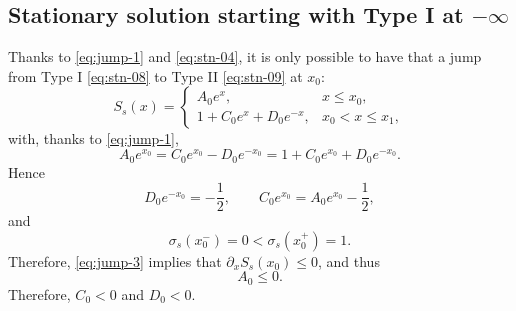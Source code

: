 \documentclass[12pt]{article}
\theoremstyle{definition}
\theoremstyle{remark}
\newcommand{\dx}{\partial_x}
\numberwithin{equation}{section}
\begin{document}
\subsection{Stationary solution starting with Type I at $ -\infty $}
\label{sec:stationary_first_kind}

Thanks to \eqref{eq:jump-1} and \eqref{eq:stn-04}, it is only possible to have that a jump from Type I \eqref{eq:stn-08} to Type II \eqref{eq:stn-09} at $ x_0 $: 
\begin{equation}
    \label{eq:stn-11}
    S_s(x) = \begin{cases}
        A_0 e^{x}, & x \leq x_0, \\
        1 + C_0 e^x + D_0 e^{-x}, & x_0 < x \leq x_1, 
    \end{cases}
\end{equation}
with, thanks to \eqref{eq:jump-1},
\begin{equation}\label{eq:stn-12}
    A_0 e^{x_0} = C_0 e^{x_0} - D_0 e^{-x_0} = 1 + C_0 e^{x_0} + D_0 e^{-x_0}. 
\end{equation}
Hence 
\begin{equation}
    \label{eq:stn-14}
    D_0 e^{-x_0} = - \frac{1}{2}, \qquad C_0 e^{x_0} = A_0 e^{x_0} - \frac{1}{2},
\end{equation}
and 
\begin{equation}
    \label{eq:stn-15}
    \sigma_s(x_0^-) = 0 < \sigma_s(x_0^+) = 1. 
\end{equation}
Therefore, \eqref{eq:jump-3} implies that $ \dx S_s(x_0) \leq 0 $, and thus
\begin{equation}
    \label{eq:stn-17}
    A_0 \leq 0.
\end{equation}
Therefore, $ C_0 < 0 $ and $ D_0 < 0 $. 
\end{document}
